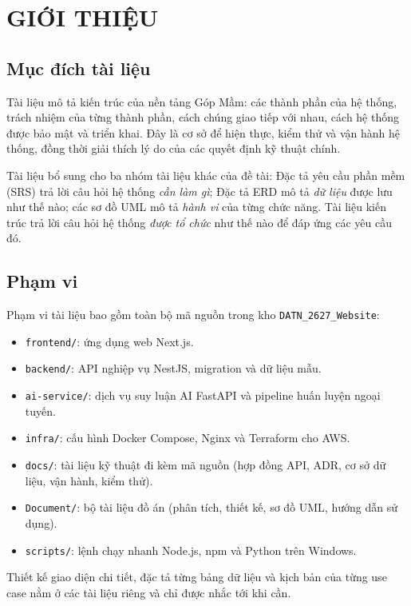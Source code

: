 \section{GIỚI THIỆU}\label{sec:gioi_thieu}

\subsection{Mục đích tài liệu}

Tài liệu mô tả kiến trúc của nền tảng Góp Mầm: các thành phần của hệ thống, trách nhiệm của từng thành phần, cách chúng giao tiếp với nhau, cách hệ thống được bảo mật và triển khai. Đây là cơ sở để hiện thực, kiểm thử và vận hành hệ thống, đồng thời giải thích lý do của các quyết định kỹ thuật chính.

Tài liệu bổ sung cho ba nhóm tài liệu khác của đề tài: Đặc tả yêu cầu phần mềm (SRS) trả lời câu hỏi hệ thống \emph{cần làm gì}; Đặc tả ERD mô tả \emph{dữ liệu} được lưu như thế nào; các sơ đồ UML mô tả \emph{hành vi} của từng chức năng. Tài liệu kiến trúc trả lời câu hỏi hệ thống \emph{được tổ chức} như thế nào để đáp ứng các yêu cầu đó.

\subsection{Phạm vi}

Phạm vi tài liệu bao gồm toàn bộ mã nguồn trong kho \texttt{DATN\_2627\_Website}:

\begin{itemize}
    \item \texttt{frontend/}: ứng dụng web Next.js.
    \item \texttt{backend/}: API nghiệp vụ NestJS, migration và dữ liệu mẫu.
    \item \texttt{ai-service/}: dịch vụ suy luận AI FastAPI và pipeline huấn luyện ngoại tuyến.
    \item \texttt{infra/}: cấu hình Docker Compose, Nginx và Terraform cho AWS.
    \item \texttt{docs/}: tài liệu kỹ thuật đi kèm mã nguồn (hợp đồng API, ADR, cơ sở dữ liệu, vận hành, kiểm thử).
    \item \texttt{Document/}: bộ tài liệu đồ án (phân tích, thiết kế, sơ đồ UML, hướng dẫn sử dụng).
    \item \texttt{scripts/}: lệnh chạy nhanh Node.js, npm và Python trên Windows.
\end{itemize}

Thiết kế giao diện chi tiết, đặc tả từng bảng dữ liệu và kịch bản của từng use case nằm ở các tài liệu riêng và chỉ được nhắc tới khi cần.

